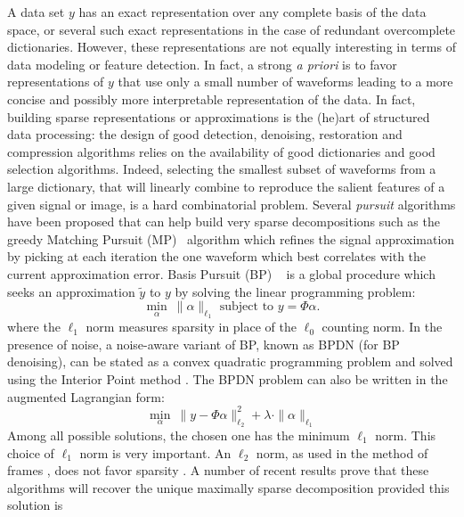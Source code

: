 %
%
A data set $y$ has an exact representation over any complete basis of the data space, or several 
such exact representations in the case of redundant overcomplete dictionaries. However, these 
representations are not equally interesting in terms of data modeling or feature detection. In fact, 
a strong \emph{a priori} is to favor representations of $y$ that use only a small number of waveforms 
leading to a more concise and possibly more interpretable representation of the data. In fact, 
building sparse representations or approximations is the (he)art of structured data processing: 
the design of good detection, denoising, restoration and compression algorithms relies on the 
availability of good dictionaries and good selection algorithms. Indeed, selecting the smallest 
subset of waveforms from a large dictionary, that will linearly combine to reproduce the salient 
features of a given signal or image, is a hard combinatorial problem. Several \emph{pursuit} algorithms 
have been proposed that can help build very sparse decompositions such as the greedy Matching Pursuit (MP)~\cite{wave:mallat93} 
algorithm which refines the signal approximation by picking at each iteration the one waveform 
which best correlates with the current approximation error. Basis Pursuit (BP) ~\cite{wave:donoho98} 
is a global procedure which seeks an approximation $\tilde{y}$ to $y$ by solving the linear programming problem:
\begin{equation}
\min_{ \alpha } ~ \|\alpha\|_{{ \ell_1}} \mbox{ subject to } y = \Phi \alpha.
\label{eqn_bp}
\end{equation}
where the ${\ell_1}$ norm measures sparsity in place of the ${\ell_0}$ counting norm. 
%
In the presence of noise, a noise-aware variant of BP, known as BPDN (for BP denoising), can be 
stated as a convex quadratic programming problem and solved using the Interior Point method 
\cite{wave:donoho98}. The BPDN problem can also be written in the augmented Lagrangian form:
\begin{equation}
\min_{ \alpha } ~  \|y - \Phi\alpha\|_{{ \ell_2}} ^2 + \lambda \cdot \|\alpha\|_{ \ell_1}
\label{eqn_mp}
\end{equation}
Among all possible solutions, the chosen one has the minimum ${\ell_1}$ norm. This choice of 
$\ell_1$ norm is very important. An $\ell_2$ norm, as used in the method of frames \cite{wave:daube88b}, 
does not favor sparsity \cite{wave:donoho98}. A number of recent results prove that these 
algorithms will recover the unique maximally sparse decomposition provided this solution is 
